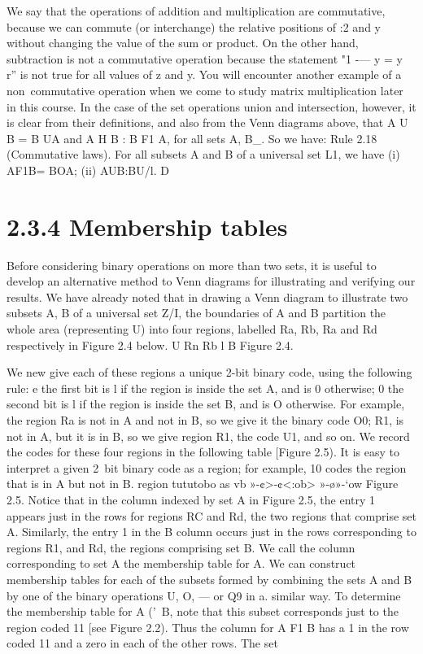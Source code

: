 {{%
We say that the operations of addition and multiplication are commutative, because we can
commute (or interchange) the relative positions of :2 and y without changing the value of the sum
or product. On the other hand, subtraction is not a commutative operation because the statement
"1 -— y = y ~ r” is not true for all values of z and y. You will encounter another example of a
non~commutative operation when we come to study matrix multiplication later in this course.
In the case of the set operations union and intersection, however, it is clear from their deﬁnitions,
and also from the Venn diagrams above, that A U B = B UA and A H B : B F1 A, for all sets A, B_.
So we have:
Rule 2.18 (Commutative laws). For all subsets A and B of a universal set L1, we have
(i) AF1B= BOA; (ii) AUB:BU/l. D
\section{2.3.4 Membership tables}
Before considering binary operations on more than two sets, it is useful to develop an alternative
method to Venn diagrams for illustrating and verifying our results.
We have already noted that in drawing a Venn diagram to illustrate two subsets A, B of a universal
set Z/I, the boundaries of A and B partition the whole area (representing U) into four regions,
labelled Ra, Rb, Ra and Rd respectively in Figure 2.4 below.
U
Rn
Rb
l B
Figure 2.4.


We new give each of these regions a unique 2-bit binary code, using the following rule:
e the ﬁrst bit is l if the region is inside the set A, and is 0 otherwise;
0 the second bit is l if the region is inside the set B, and is O otherwise.
For example, the region Ra is not in A and not in B, so we give it the binary code O0; R1, is not
in A, but it is in B, so we give region R1, the code U1, and so on. We record the codes for these
four regions in the following table [Figure 2.5). It is easy to interpret a given 2~bit binary code as
a region; for example, 10 codes the region that is in A but not in B.
region
tututobo
as vb
»-¢>-¢<:ob>
»-\o»-‘ow
Figure 2.5.
Notice that in the column indexed by set A in Figure 2.5, the entry 1 appears just in the rows for
regions RC and Rd, the two regions that comprise set A. Similarly, the entry 1 in the B column
occurs just in the rows corresponding to regions R1, and Rd, the regions comprising set B. We call
the column corresponding to set A the membership table for A.
We can construct membership tables for each of the subsets formed by combining the sets A and B
by one of the binary operations U, O, — or Q9 in a. similar way. To determine the membership table
for A ('\ B, note that this subset corresponds just to the region coded 11 [see Figure 2.2). Thus
the column for A F1 B has a 1 in the row coded 11 and a zero in each of the other rows. The set

}}

